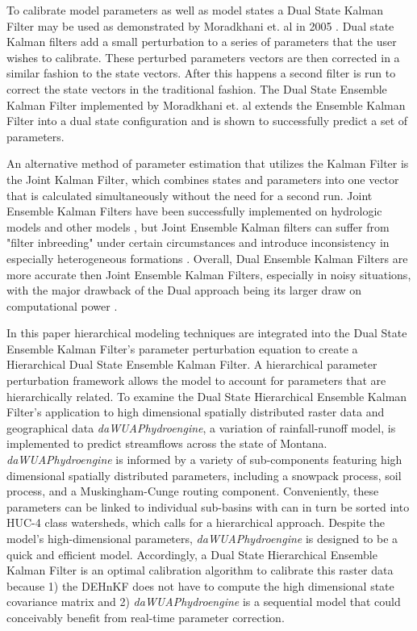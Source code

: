 	To calibrate model parameters as well as model states a Dual State Kalman Filter may be used as demonstrated by Moradkhani et. al in 2005 \cite{Moradkhani2005}. Dual state Kalman filters add a small perturbation to a series of parameters that the user wishes to calibrate. These perturbed parameters vectors are then corrected in a similar fashion to the state vectors. After this happens a second filter is run to correct the state vectors in the traditional fashion. The Dual State Ensemble Kalman Filter implemented by Moradkhani et. al\cite{Moradkhani2005} extends the Ensemble Kalman Filter into a dual state configuration and is shown to successfully predict a set of parameters.
	
	An alternative method of parameter estimation that utilizes the Kalman Filter is the Joint Kalman Filter, which combines states and parameters into one vector that is calculated simultaneously without the need for a second run. Joint Ensemble Kalman Filters have been successfully implemented on hydrologic models \cite{Vrugt2005} and other models \cite{Chen2008}, but Joint Ensemble Kalman filters can suffer from "filter inbreeding" under certain circumstances \cite{HendricksFranssen2008} and introduce inconsistency in especially heterogeneous formations \cite{Wen2006}. Overall, Dual Ensemble Kalman Filters are more accurate then Joint Ensemble Kalman Filters, especially in noisy situations, with the major drawback of the Dual approach being its larger draw on computational power \cite{Mariani2005}.
	
	In this paper hierarchical modeling techniques are integrated into the Dual State Ensemble Kalman Filter's parameter perturbation equation to create a Hierarchical Dual State Ensemble Kalman Filter. A hierarchical parameter perturbation framework allows the model to account for parameters that are hierarchically related. To examine the Dual State Hierarchical Ensemble Kalman Filter's application to high dimensional spatially distributed raster data and geographical data \textit{daWUAPhydroengine}, a variation of rainfall-runoff model, is implemented to predict streamflows across the state of Montana. \textit{daWUAPhydroengine} is informed by a variety of sub-components featuring high dimensional spatially distributed parameters, including a snowpack process, soil process, and a Muskingham-Cunge routing component. Conveniently, these parameters can be linked to individual sub-basins with can in turn be sorted into HUC-4 class watersheds, which calls for a hierarchical approach. Despite the model's high-dimensional parameters, \textit{daWUAPhydroengine} is designed to be a quick and efficient model. Accordingly, a Dual State Hierarchical Ensemble Kalman Filter is an optimal calibration algorithm to calibrate this raster data because 1) the DEHnKF does not have to compute the high dimensional state covariance matrix and 2) \textit{daWUAPhydroengine} is a sequential model that could conceivably benefit from real-time parameter correction.
	
